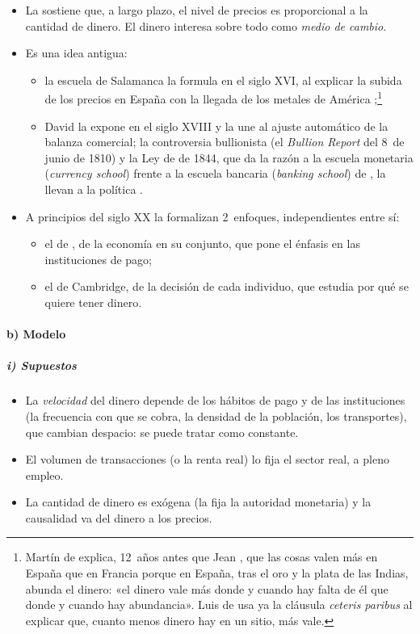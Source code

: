\documentclass[11pt]{article}
\begin{document}
\begin{itemize}
\item La  sostiene que, a largo plazo, el nivel de precios es proporcional a la cantidad de dinero. El dinero interesa sobre todo como \emph{medio de cambio}.
\item Es una idea antigua:
  \begin{itemize}
  \item la escuela de Salamanca la formula en el siglo XVI, al explicar la subida de los precios en España con la llegada de los metales de América ;\footnote{Martín de \textcite{Azpilcueta1556Cambios} explica, 12~años antes que Jean \textcite{Bodin1568Reponse}, que las cosas valen más en España que en Francia porque en España, tras el oro y la plata de las Indias, abunda el dinero: «el dinero vale más donde y cuando hay falta de él que donde y cuando hay abundancia»\nocite{GriceHutchinson1952School}. Luis de \textcite{Molina1597Iustitia} usa ya la cláusula \emph{ceteris paribus} al explicar que, cuanto menos dinero hay en un sitio, más vale.}
  \item David \textcite{Hume1752Money} la expone en el siglo XVIII y la une al ajuste automático de la balanza comercial; la controversia bullionista (el \emph{Bullion Report} del 8~de junio de 1810) y la Ley de  de 1844, que da la razón a la escuela monetaria (\emph{currency school}) frente a la escuela bancaria (\emph{banking school}) de , la llevan a la política .
  \end{itemize}
\item A principios del siglo XX la formalizan 2~enfoques, independientes entre sí:
  \begin{itemize}
  \item el de , de la economía en su conjunto, que pone el énfasis en las instituciones de pago;
  \item el de Cambridge, de la decisión de cada individuo, que estudia por qué se quiere tener dinero.
  \end{itemize}
\end{itemize}

\paragraph{b) Modelo}

\subparagraph{i) Supuestos}

\begin{itemize}
\item La \emph{velocidad} del dinero depende de los hábitos de pago y de las instituciones (la frecuencia con que se cobra, la densidad de la población, los transportes), que cambian despacio: se puede tratar como constante.
\item El volumen de transacciones (o la renta real) lo fija el sector real, a pleno empleo.
\item La cantidad de dinero es exógena (la fija la autoridad monetaria) y la causalidad va del dinero a los precios.
\end{itemize}
\end{document}
